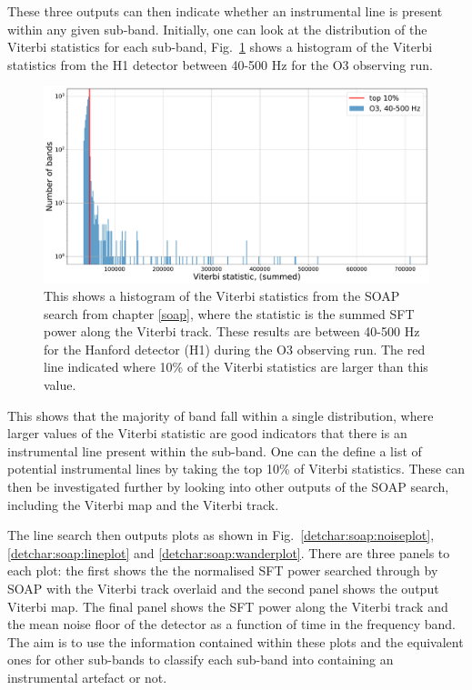 These three outputs can then indicate whether an instrumental line is present within any given sub-band.
Initially, one can look at the distribution of the Viterbi statistics for each sub-band, Fig.~\ref{detchar:soap:rankedstats} shows a histogram of the Viterbi statistics from the H1 detector between 40-500 Hz for the O3 observing run.
%
\begin{figure}[ht]
	\centering
	\includegraphics[width=\textwidth]{C6_detchar/statistic_hists_O3_H1.pdf}
	\caption[Viterbi statistics for H1 in O3, 40-500 Hz]{This shows a histogram of the Viterbi statistics from the SOAP search from chapter \ref{soap}, where the statistic is the summed \gls{SFT}  power along the Viterbi track. These results are between 40-500 Hz for the Hanford detector (H1) during the O3 observing run. The red line indicated where 10\% of the Viterbi statistics are larger than this value. }
	\label{detchar:soap:rankedstats}
\end{figure}
%
This shows that the majority of band fall within a single distribution, where larger values of the Viterbi statistic are good indicators that there is an instrumental line present within the sub-band.
One can the define a list of potential instrumental lines by taking the top 10\% of Viterbi statistics. 
These can then be investigated further by looking into other outputs of the SOAP search, including the Viterbi map and the Viterbi track.

%
The line search then outputs plots as shown in Fig.~\ref{detchar:soap:noiseplot}, \ref{detchar:soap:lineplot} and
\ref{detchar:soap:wanderplot}. 
There are three panels to each plot: the first shows the the normalised \gls{SFT} power searched through by SOAP with the Viterbi track overlaid and the second panel shows the output Viterbi map.
The final panel shows the \gls{SFT} power along the Viterbi track and the mean noise floor of the detector as a function of time in the frequency band.  
The aim is to use the information contained within these plots and the equivalent ones for other sub-bands to classify each sub-band into containing an instrumental artefact or not. 

